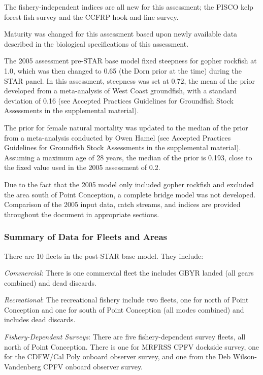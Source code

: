 \documentclass[12pt,]{article}
\begin{document}
The fishery-independent indices are all new for this assessment; the
PISCO kelp forest fish survey and the CCFRP hook-and-line survey.

Maturity was changed for this assessment based upon newly available data
described in the biological specifications of this assessment.

The 2005 assessment pre-STAR base model fixed steepness for gopher
rockfish at 1.0, which was then changed to 0.65 (the Dorn prior at the
time) during the STAR panel. In this assessment, steepness was set at
0.72, the mean of the prior developed from a meta-analysis of West Coast
groundfish, with a standard deviation of 0.16 (see Accepted Practices
Guidelines for Groundfish Stock Assessments in the supplemental
material).

The prior for female natural mortality was updated to the median of the
prior from a meta-analysis conducted by Owen Hamel (see Accepted
Practices Guidelines for Groundfish Stock Assessments in the
supplemental material). Assuming a maximum age of 28 years, the median
of the prior is 0.193, close to the fixed value used in the 2005
assessment of 0.2.

Due to the fact that the 2005 model only included gopher rockfish and
excluded the area south of Point Conception, a complete bridge model was
not developed. Comparison of the 2005 input data, catch streams, and
indices are provided throughout the document in appropriate sections.

\subsubsection{Summary of Data for Fleets and
Areas}\label{summary-of-data-for-fleets-and-areas}

There are 10 fleets in the post-STAR base model. They include:

\emph{Commercial}: There is one commercial fleet the includes GBYR
landed (all gears combined) and dead discards.

\emph{Recreational}: The recreational fishery include two fleets, one
for north of Point Conception and one for south of Point Conception (all
modes combined) and includes dead discards.

\emph{Fishery-Dependent Surveys}: There are five fishery-dependent
survey fleets, all north of Point Conception. There is one for MRFRSS
CPFV dockside survey, one for the CDFW/Cal Poly onboard observer survey,
and one from the Deb Wilson-Vandenberg CPFV onboard observer survey.
\end{document}
